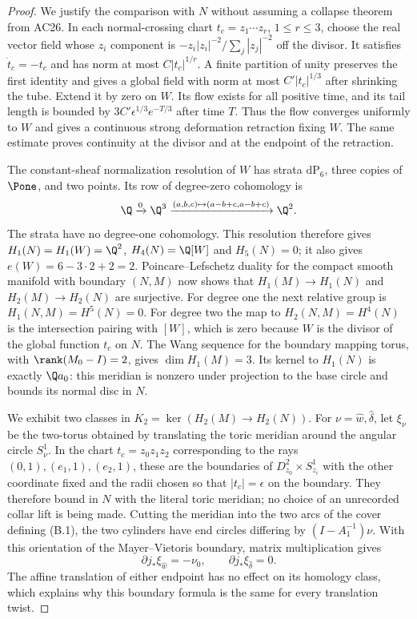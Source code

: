 \begin{proof}
We justify the comparison with $N$ without assuming a collapse
theorem from AC26. In each normal-crossing chart
$t_c=z_1\cdots z_r$, $1\le r\le3$, choose the real vector field
whose $z_i$ component is
$-z_i|z_i|^{-2}/\sum_j|z_j|^{-2}$ off the divisor.
It satisfies $\dot t_c=-t_c$ and has norm at most
$C|t_c|^{1/r}$. A finite partition of unity preserves the first
identity and gives a global field with norm at most
$C'|t_c|^{1/3}$ after shrinking the tube. Extend it by zero on $W$.
Its flow exists for all positive time, and its tail length is
bounded by $3C'\epsilon^{1/3}e^{-T/3}$ after time $T$.
Thus the flow converges uniformly to $W$ and gives a continuous
strong deformation retraction fixing $W$. The same estimate proves
continuity at the divisor and at the endpoint of the retraction.

The constant-sheaf normalization resolution of $W$ has strata
$\mathrm{dP}_6$, three copies of $\Pone$, and two points.
Its row of degree-zero cohomology is
\[
 \Q\xrightarrow{0}\Q^3
 \xrightarrow{(a,b,c)\mapsto(a-b+c,a-b+c)}\Q^2.
\]
The strata have no degree-one cohomology. This resolution therefore
gives $H_1(N)=H_1(W)=\Q^2$, $H_4(N)=\Q[W]$ and $H_5(N)=0$;
it also gives $e(W)=6-3\cdot2+2=2$.
Poincare--Lefschetz duality for the compact smooth manifold with
boundary $(N,M)$ now shows that $H_1(M)\to H_1(N)$ and
$H_2(M)\to H_2(N)$ are surjective. For degree one the next
relative group is $H_1(N,M)=H^5(N)=0$.
For degree two the map to $H_2(N,M)=H^4(N)$ is the intersection
pairing with $[W]$, which is zero because $W$ is the divisor of
the global function $t_c$ on $N$. The Wang sequence for the
boundary mapping torus, with $\rank(M_0-I)=2$, gives
$\dim H_1(M)=3$. Its kernel to $H_1(N)$ is exactly
$\Q a_0$: this meridian is nonzero under projection to the base
circle and bounds its normal disc in $N$.

We exhibit two classes in
$K_2=\ker(H_2(M)\to H_2(N))$.
For $\nu=\hat w,\hat\delta$, let $\xi_\nu$ be the two-torus
obtained by translating the toric meridian around the angular
circle $S^1_\nu$. In the chart $t_c=z_0z_1z_2$ corresponding to
the rays $(0,1),(e_1,1),(e_2,1)$, these are the boundaries of
$D^2_{z_0}\times S^1_{z_i}$ with the other coordinate fixed
and the radii chosen so that $|t_c|=\epsilon$ on the boundary.
They therefore bound in $N$ with the literal toric meridian;
no choice of an unrecorded collar lift is being made.
Cutting the meridian into the two arcs of the cover defining
(B.1), the two cylinders have end circles differing by
$(I-A_1^{-1})\nu$. With this orientation of the Mayer--Vietoris
boundary, matrix multiplication gives
\[
 \partial j_*\xi_{\hat w}=-\nu_0,\qquad
 \partial j_*\xi_{\hat\delta}=0.                       \tag{B.3}
\]
The affine translation of either endpoint has no effect on its
homology class, which explains why this boundary formula is the
same for every translation twist.


\end{proof}
